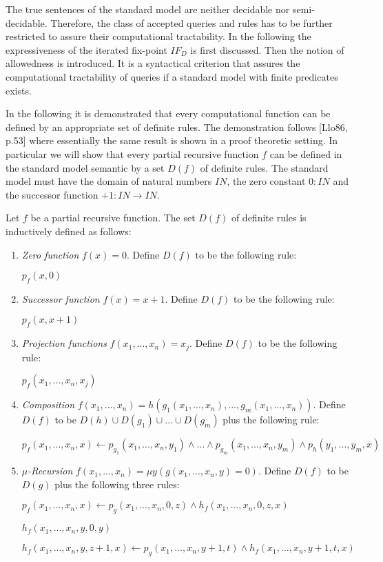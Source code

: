 \label{secallns}
The true sentences of the standard model are neither decidable nor semi-decidable. Therefore,
the class of accepted queries and rules has to be further restricted to assure their 
computational tractability. In the following the expressiveness of the iterated fix-point 
$IF_D$ is first discussed. Then the notion of allowedness is introduced. It is a syntactical
criterion that assures the computational tractability of queries if a standard model
with finite predicates exists.

In the following it is demonstrated that every computational function can be defined by
an appropriate set of definite rules. The demonstration follows [Llo86, p.53] where 
essentially the same result is shown in a proof theoretic setting. In particular we will
show that every partial recursive function $f$ can be defined in the standard model 
semantic by a set $D(f)$ of definite rules. The standard model must have the domain of 
natural numbers $I\!\!N$, the zero constant $0:I\!\!N$ and the successor function 
$+1:I\!\!N \rightarrow I\!\!N$.

\begin{Def}
\label{deffun}
Let $f$ be a partial recursive function. The set $D(f)$ of definite rules is inductively 
defined as follows:

\begin{enumerate}
\item {\em Zero function} $f(x)=0$. Define $D(f)$ to be the following rule:

{\small \quad $p_f(x,0)$}

\item {\em Successor function} $f(x)=x+1$. Define $D(f)$ to be the following rule:

{\small \quad $p_f(x,x+1)$}

\item {\em Projection functions} $f(x_1,...,x_n)=x_j$. Define $D(f)$ to be the following rule:

{\small \quad $p_f(x_1,...,x_n,x_j)$}

\item {\em Composition} $f(x_1,...,x_n)=h(g_1(x_1,...,x_n),...,g_m(x_1,...,x_n))$. Define
$D(f)$ to be $D(h) \cup D(g_1) \cup ... \cup D(g_m)$ plus the following rule:

{\small \quad $p_f(x_1,...,x_n,x)\leftarrow p_{g_1}(x_1,...,x_n,y_1) \wedge ... 
\wedge p_{g_m}(x_1,...,x_n,y_m)\wedge p_h(y_1,...,y_m,x)$}

\item {\em $\mu$-Recursion} $f(x_1,...,x_n)=\mu y(g(x_1,...,x_n,y)=0)$. Define $D(f)$ to
be $D(g)$ plus the following three rules:

{\small \quad $p_f(x_1,...,x_n,x)\leftarrow p_g(x_1,...,x_n,0,z)\wedge h_f(x_1,...,x_n,0,z,x)$

\quad $h_f(x_1,...,x_n,y,0,y)$

\quad $h_f(x_1,...,x_n,y,z+1,x)\leftarrow p_g(x_1,...,x_n,y+1,t)\wedge h_f(x_1,...,x_n,y+1,t,x)$}

\end{enumerate}
\end{Def}

